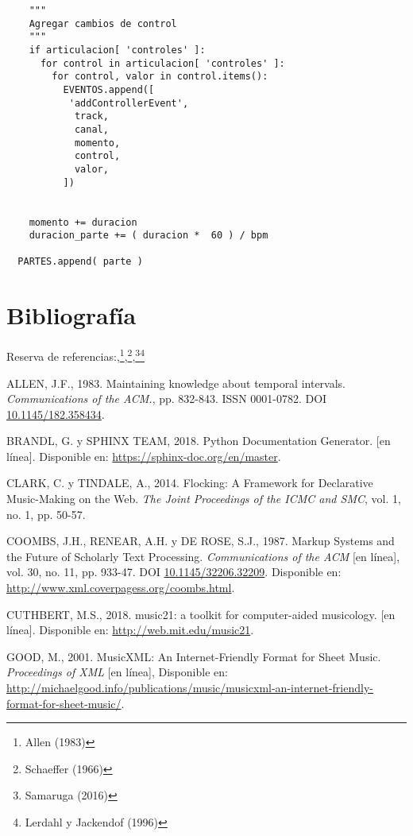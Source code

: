 \documentclass[]{article}
\begin{document}
\begin{verbatim}
    """
    Agregar cambios de control
    """
    if articulacion[ 'controles' ]:
      for control in articulacion[ 'controles' ]:
        for control, valor in control.items():
          EVENTOS.append([
           'addControllerEvent',
            track, 
            canal, 
            momento, 
            control,
            valor, 
          ])


    momento += duracion
    duracion_parte += ( duracion *  60 ) / bpm 

  PARTES.append( parte )
\end{verbatim}

\newpage

\hypertarget{bibliografuxeda}{%
\section{Bibliografía}\label{bibliografuxeda}}

Reserva de referencias:,\footnote{Allen (1983)},\footnote{Schaeffer
  (1966)},\footnote{Samaruga (2016)}\footnote{Lerdahl y Jackendof (1996)}

\newpage

\hypertarget{refs}{}
\leavevmode\hypertarget{ref-allen}{}%
ALLEN, J.F., 1983. Maintaining knowledge about temporal intervals.
\emph{Communications of the ACM.}, pp. 832-843. ISSN 0001-0782. DOI
\href{https://doi.org/10.1145/182.358434}{10.1145/182.358434}.

\leavevmode\hypertarget{ref-sphinx}{}%
BRANDL, G. y SPHINX TEAM, 2018. Python Documentation Generator. {[}en
línea{]}. Disponible en: \url{https://sphinx-doc.org/en/master}.

\leavevmode\hypertarget{ref-clark}{}%
CLARK, C. y TINDALE, A., 2014. Flocking: A Framework for Declarative
Music-Making on the Web. \emph{The Joint Proceedings of the ICMC and
SMC}, vol. 1, no. 1, pp. 50-57.

\leavevmode\hypertarget{ref-coombs}{}%
COOMBS, J.H., RENEAR, A.H. y DE ROSE, S.J., 1987. Markup Systems and the
Future of Scholarly Text Processing. \emph{Communications of the ACM}
{[}en línea{]}, vol. 30, no. 11, pp. 933-47. DOI
\href{https://doi.org/10.1145/32206.32209}{10.1145/32206.32209}.
Disponible en: \url{http://www.xml.coverpagess.org/coombs.html}.

\leavevmode\hypertarget{ref-music21}{}%
CUTHBERT, M.S., 2018. music21: a toolkit for computer-aided musicology.
{[}en línea{]}. Disponible en: \url{http://web.mit.edu/music21}.

\leavevmode\hypertarget{ref-good}{}%
GOOD, M., 2001. MusicXML: An Internet-Friendly Format for Sheet Music.
\emph{Proceedings of XML} {[}en línea{]}, Disponible en:
\url{http://michaelgood.info/publications/music/musicxml-an-internet-friendly-format-for-sheet-music/}.
\end{document}
